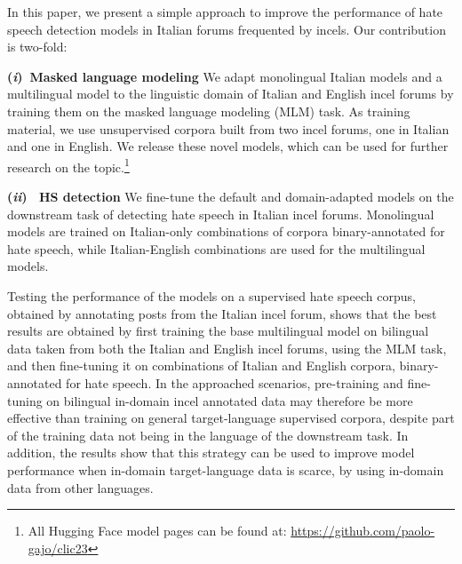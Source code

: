 \documentclass[11pt]{article}
\newcommand{\Ni}{({\em i})~}
\newcommand{\Nii}{({\em ii})~}
\newcommand{\paolo}[1]{{\color{red} #1}}
\newcommand{\todoA}[1]{\todo[color=blue!40]{A: #1}}
\begin{document}
In this paper, we present a simple approach to improve the performance of hate speech detection models in Italian forums frequented by incels. Our contribution is two-fold:


\noindent\textbf{\Ni Masked language modeling} We adapt monolingual Italian models and a multilingual model to the linguistic domain of Italian and English incel forums by training them on the masked language modeling (MLM) task.
As training material, we use unsupervised corpora built from two incel forums, one in Italian and one in English.
We release these novel models, which can be used for further research on the topic.\footnote{\paolo{All Hugging Face model pages can be found at: }\url{https://github.com/paolo-gajo/clic23}}

\noindent\textbf{\Nii \paolo{HS} detection}
We fine-tune the \paolo{default} and domain-adapted models on the downstream task of detecting hate speech in Italian incel forums.
Monolingual models are trained on Italian-only combinations of corpora binary-annotated for hate speech, while Italian-English combinations are used for the multilingual models.

Testing \paolo{the performance of the models} on a supervised hate speech corpus, obtained by annotating posts from the Italian incel forum, shows that the best results are obtained by first training the base multilingual model on bilingual data taken from both the Italian and English incel forums, using the MLM task, and then fine-tuning it on combinations of Italian and English corpora, binary-annotated for hate speech. In the approached scenarios, pre-training and fine-tuning on bilingual in-domain incel annotated data may therefore be more effective than training on general target-language supervised corpora, despite part of the training data not being in the language of the downstream task. In addition, the results show that this strategy can be used to improve model performance when in-domain target-language data is scarce, by using in-domain data from other languages.
\end{document}
